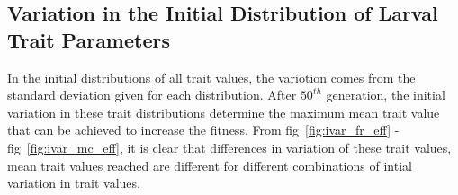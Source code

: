 \subsection{Variation in the Initial Distribution of Larval Trait Parameters}
In the initial distributions of all trait values, the variotion comes from the standard deviation given for each distribution. After $50^{th}$ generation, the initial variation in these trait distributions determine the maximum mean trait value that can be achieved to increase the fitness. From fig~\ref{fig:ivar_fr_eff} - fig~\ref{fig:ivar_mc_eff}, it is clear that differences in variation of these trait values, mean trait values reached are different for different combinations of intial variation in trait values.
\begin{figure}[p]
  \\
\end{figure}
